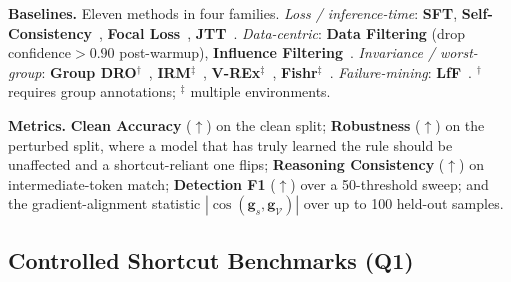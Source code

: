 \textbf{Baselines.} Eleven methods in four families. \emph{Loss / inference-time}: \textbf{SFT}, \textbf{Self-Consistency}~\cite{wang2023selfconsistency}, \textbf{Focal Loss}~\cite{lin2018focallossdenseobject}, \textbf{JTT}~\cite{liu2021justtraintwiceimproving}. \emph{Data-centric}: \textbf{Data Filtering} (drop confidence$>0.90$ post-warmup), \textbf{Influence Filtering}~\cite{koh2020understandingblackboxpredictionsinfluence}. \emph{Invariance / worst-group}: \textbf{Group DRO}$^\dagger$~\cite{sagawa2020distributionallyrobustneuralnetworks}, \textbf{IRM}$^\ddagger$~\cite{arjovsky2020invariantriskminimization}, \textbf{V-REx}$^\ddagger$~\cite{krueger2021outofdistributiongeneralizationriskextrapolation}, \textbf{Fishr}$^\ddagger$~\cite{rame2022fishrinvariantgradientvariances}. \emph{Failure-mining}: \textbf{LfF}~\cite{nam2020learningfailuretrainingdebiased}. $^\dagger$ requires group annotations; $^\ddagger$ multiple environments.

\textbf{Metrics.} \textbf{Clean Accuracy} ($\uparrow$) on the clean split; \textbf{Robustness} ($\uparrow$) on the perturbed split, where a model that has truly learned the rule should be unaffected and a shortcut-reliant one flips; \textbf{Reasoning Consistency} ($\uparrow$) on intermediate-token match; \textbf{Detection F1} ($\uparrow$) over a 50-threshold sweep; and the gradient-alignment statistic $|\cos(\mathbf{g}_s,\mathbf{g}_{\mathcal{V}})|$ over up to 100 held-out samples.

\subsection{Controlled Shortcut Benchmarks (Q1)}
\label{sec:exp_main}

